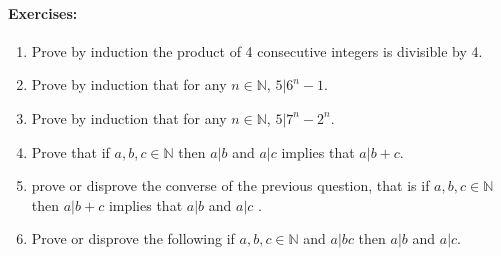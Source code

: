 \paragraph{\bf Exercises:} 
\begin{enumerate}
\item Prove by induction the product of 4 consecutive integers is divisible by 4.
\item Prove by induction that for any $n\in \mathbb{N}$, $5 | 6^{n}-1$.
\item Prove by induction that for any $n\in \mathbb{N}$, $5 | 7^{n}-2^{n}$.
\item Prove that if $a, b, c \in \mathbb{N}$ then $a | b$ and $a | c$ implies that $a | b+c$.
\item prove or disprove the converse of the previous question, that is if $a, b, c \in \mathbb{N}$ then $a | b +c$ implies that $a | b$ and $a | c$ .
\item Prove or disprove the following if $a, b, c \in \mathbb{N}$  and $a | bc $  then $a | b$ and $a | c$.



\end{enumerate}
